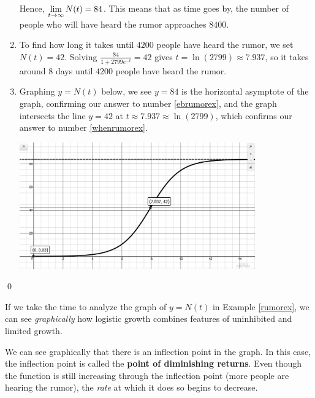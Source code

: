 \documentclass{ximera}
\begin{document}
\begin{ex}
\begin{enumerate}
Hence, $\ds{\lim_{t \rightarrow \infty} N(t) = 84}$.     This means that as time goes by, the number of people who will have heard the rumor approaches $8400$. 

\item  To find how long it takes until $4200$ people have heard the rumor, we set $N(t) = 42$.  Solving $\frac{84}{1+2799e^{-t}} = 42$ gives $t =  \ln(2799) \approx 7.937$, so   it takes around $8$ days until $4200$ people have heard the rumor.

\item  Graphing $y=N(t)$ below, we see $y=84$ is the horizontal asymptote of the graph, confirming our answer to number  \ref{ebrumorex}, and the graph intersects the line $y=42$ at $t \approx 7.937 \approx \ln(2799) $, which confirms our answer to number \ref{whenrumorex}.

\begin{center}

\includegraphics[width=4in]{./ApplicationsofExponentialandLogarithmicFunctionsGraphics/ExpLogAppEx01.jpg} 


\end{center}

\end{enumerate}

\qed

\end{ex}

If we take the time to analyze the graph of $y=N(t)$ in Example \ref{rumorex}, we can see \textit{graphically} how logistic growth combines  features of uninhibited and limited growth.  

\smallskip

We can see graphically that there is an inflection point in the graph. In this case, the inflection point is called the \textbf{point of diminishing returns}.    Even though the function is still increasing through the inflection point (more people are hearing the rumor), the \textit{rate} at which it does so begins to decrease. 
\end{document}
